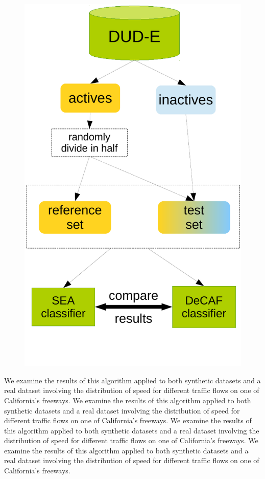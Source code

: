 \documentclass[a0paper,portrait]{baposter}
\begin{document}
\begin{poster}
{\begin{figure}
    \vspace{10pt}
    \begin{center}
        \includegraphics[width=\linewidth]{class}
    \end{center}
\end{figure}

We examine the results of this algorithm applied to both synthetic datasets and a real dataset involving the distribution of speed for different traffic flows on one of California's freeways. We examine the results of this algorithm applied to both synthetic datasets and a real dataset involving the distribution of speed for different traffic flows on one of California's freeways. We examine the results of this algorithm applied to both synthetic datasets and a real dataset involving the distribution of speed for different traffic flows on one of California's freeways. We examine the results of this algorithm applied to both synthetic datasets and a real dataset involving the distribution of speed for different traffic flows on one of California's freeways. 

}
\end{poster}
\end{document}

